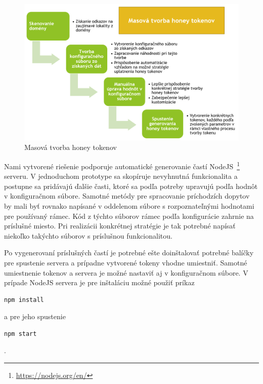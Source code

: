 \documentclass[conference, 11pt,slovak,a4paper,twoside]{IEEEtran}
\begin{document}
\begin{figure}[!t]  %
					\begin{center}
									\includegraphics[width=\linewidth]{fig/massTokenGeneration.png}
									\caption{Masová tvorba honey tokenov}
									\label{massHoneyTokenProduction}
					\end{center}
\end{figure}


Nami vytvorené riešenie podporuje automatické generovanie častí NodeJS~\footnote{\url{https://nodejs.org/en/}} serveru. V jednoduchom prototype sa skopíruje nevyhnutná funkcionalita a postupne sa pridávajú ďalšie časti, ktoré sa podľa potreby upravujú podľa hodnôt v konfiguračnom súbore. Samotné metódy pre spracovanie príchodzích dopytov by mali byť rovnako napísané v oddelenom súbore s rozpoznateľnými hodnotami pre používaný rámec. Kód z týchto súborov rámec podľa konfigurácie zahrnie na príslušné miesto. Pri realizácii konkrétnej stratégie je tak potrebné napísať niekoľko takýchto súborov s príslušnou funkcionalitou. 

Po vygenerovaní príslušných častí je potrebné ešte doinštalovať potrebné balíčky pre spustenie servera a prípadne vytvorené tokeny vhodne umiestniť. Samotné umiestnenie tokenov a servera je možné nastaviť aj v konfiguračnom súbore. V prípade NodeJS servera je pre inštaláciu možné použiť príkaz 

\begin{lstlisting}
npm install
\end{lstlisting} 

a pre jeho spustenie 

\begin{lstlisting}
npm start
\end{lstlisting}.
\end{document}
